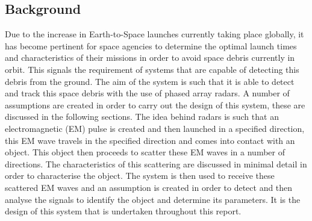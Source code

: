 \documentclass[11pt]{witseiepaper}
\begin{document}
\subsection{Background} \label{sec:Background}
Due to the increase in Earth-to-Space launches currently taking place globally, it has become pertinent for space agencies to determine the optimal launch times and characteristics of their missions in order to avoid space debris currently in orbit. This signals the requirement of systems that are capable of detecting this debris from the ground.
The aim of the system is such that it is able to detect and track this space debris with the use of phased array radars.
A number of assumptions are created in order to carry out the design of this system, these are discussed in the following sections.
The idea behind radars is such that an electromagnetic (EM) pulse is created and then launched in a specified direction, this EM wave travels in the specified direction and comes into contact with an object. This object then proceeds to scatter these EM waves in a number of directions. The characteristics of this scattering are discussed in minimal detail in order to characterise the object. 
The system is then used to receive these scattered EM waves and an assumption is created in order to detect and then analyse the signals to identify the object and determine its parameters.
It is the design of this system that is undertaken throughout this report. 
\end{document}
